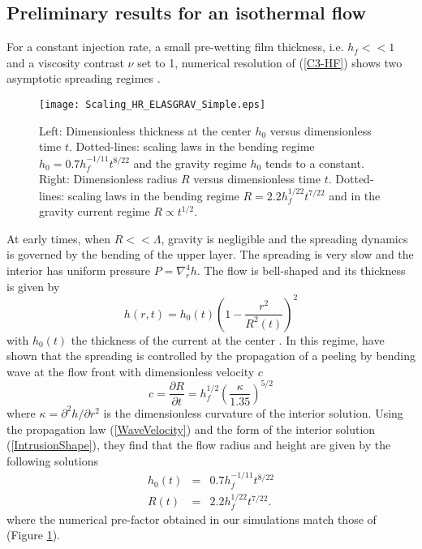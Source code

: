 \subsection{Preliminary results for an isothermal flow}
\label{sec:prel-results-isoth}

For a  constant injection  rate, a  small pre-wetting  film thickness,
i.e.   $h_f<<1$ and  a viscosity  contrast $\nu$  set to  1, numerical
resolution  of (\ref{C3-HF})  shows two  asymptotic spreading  regimes
\citep{Michaut:2011kg,Lister:2013ia}.
\begin{figure}
  \begin{center}
    \graphicspath{ {/Users/thorey/Documents/These/Projet/Refroidissement/Skin_Model/Figure/JFM_V13/} }
    \texttt{[image: Scaling\_HR\_ELASGRAV\_Simple.eps]}
    \caption{Left: Dimensionless thickness at  the center $h_0$ versus
      dimensionless  time  $t$.   Dotted-lines: scaling  laws  in  the
      bending  regime $h_0=  0.7h_f^{-1/11}t^{8/22}$  and the  gravity
      regime $h_0$  tends to a constant.   Right: Dimensionless radius
      $R$ versus  dimensionless time $t$.  Dotted-lines:  scaling laws
      in  the bending  regime  $R= 2.2h_f^{1/22}t^{7/22}$  and in  the
      gravity current regime $R\propto t^{1/2}$.}
    \label{Scaling_HR_ELASGRAV_Simple}
  \end{center}
\end{figure}

At  early times,  when  $R<<\Lambda$, gravity  is  negligible and  the
spreading dynamics is governed by the bending of the upper layer.  The
spreading  is  very  slow  and   the  interior  has  uniform  pressure
$P =\nabla_r^4h$.  The flow is  bell-shaped and its thickness is given
by
\begin{equation}
  h(r,t) = h_0(t)\left(1-\frac{r^2}{R^2(t)}\right)^2
  \label{IntrusionShape}
\end{equation}
with   $h_0(t)$  the   thickness  of   the  current   at  the   center
\citep{Michaut:2011kg,Lister:2013ia}.       In       this      regime,
\citet{Lister:2013ia} have  shown that the spreading  is controlled by
the propagation  of a peeling by  bending wave at the  flow front with
dimensionless velocity $c$
\begin{equation}
  c=    \frac{\partial             R}{\partial            t}             =h_f^{1/2}
  \left(\frac{\kappa}{1.35}\right)^{5/2}
  \label{WaveVelocity}
\end{equation}
where  $\kappa  =  \partial^2  h/\partial r^2$  is  the  dimensionless
curvature  of  the  interior  solution.   Using  the  propagation  law
(\ref{WaveVelocity})   and  the   form   of   the  interior   solution
(\ref{IntrusionShape}), they find that the  flow radius and height are
given by the following solutions
\begin{eqnarray}
  h_0(t)&=& 0.7 h_f^{-1/11}t^{8/22}\label{ScalingH}\\
  R(t) &=& 2.2h_f^{1/22}t^{7/22}\label{ScalingR}.
\end{eqnarray}
where the numerical pre-factor obtained in our simulations match those
of \citet{Lister:2013ia} (Figure \ref{Scaling_HR_ELASGRAV_Simple}).

